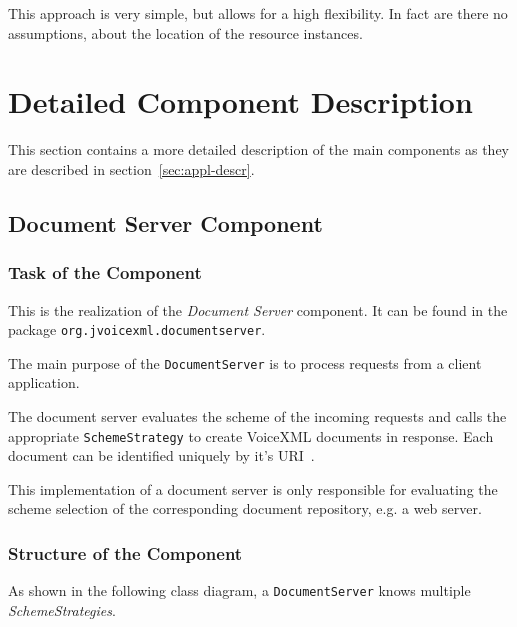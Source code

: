 \documentclass[11pt,a4paper]{article}
\begin{document}
This approach is very simple, but allows for a high flexibility. In fact are
there no assumptions, about the location of the resource instances.

\section{Detailed Component Description}
\label{sec:deta-comp-descr}

This section contains a more detailed description of the main components as they
are described in section~\ref{sec:appl-descr}.

\subsection{Document Server Component}
\label{sec:docum-serv-comp}

\subsubsection{Task of the Component}

This is the realization of the \emph{Document Server} component. It can be found
in the package \texttt{org.jvoicexml.documentserver}.

The main purpose of the \texttt{DocumentServer} is to process requests from a 
client application.

The document server evaluates the scheme of the incoming requests and
calls the appropriate \texttt{SchemeStrategy} to create VoiceXML
documents in response. Each document can be identified uniquely by
it's URI~\cite{w3.org:addressing}.

This implementation of a document server is only responsible for
evaluating the scheme selection of the corresponding document repository,
e.g. a web server.

\subsubsection{Structure of the Component}

As shown in the following class diagram, a \texttt{DocumentServer}
knows multiple \emph{SchemeStrategies}.
\end{document}
